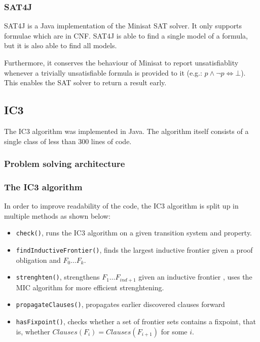 \documentclass[a4paper]{article}
\begin{document}
\subsubsection{SAT4J}
SAT4J is a Java implementation of the Minisat SAT solver. It only supports formulae which are in CNF. SAT4J is able to find a single model of a formula, but it is also able to find all models.

Furthermore, it conserves the behaviour of Minisat to report unsatisfiablity whenever a trivially unsatisfiable formula is provided to it (e.g.: $p \land \lnot p \Leftrightarrow \bot$). This enables the SAT solver to return a result early.

\subsection{IC3}
The IC3 algorithm was implemented in Java. The algorithm itself consists of a single class of less than 300 lines of code.

\subsubsection{Problem solving architecture}

\subsubsection{The IC3 algorithm}
In order to improve readability of the code, the IC3 algorithm is split up in multiple methods as shown below:

\begin{itemize}
\item \texttt{check()}, runs the IC3 algorithm on a given transition system and property.
\item \texttt{findInductiveFrontier()}, finds the largest inductive frontier given a proof obligation and $F_0 \ldots F_k$.
\item \texttt{strenghten()}, strengthens $F_1 \ldots F_{ind+1}$ given an inductive frontier	, uses the MIC algorithm for more efficient strenghtening.
\item \texttt{propagateClauses()}, propagates earlier discovered clauses forward
\item \texttt{hasFixpoint()}, checks whether a set of frontier sets contains a fixpoint, that is, whether $Clauses(F_i) = Clauses(F_{i+1})$ for some $i$.
\end{itemize}
\end{document}
